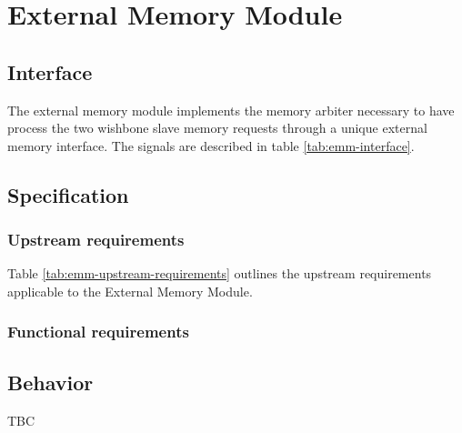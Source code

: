 \section{External Memory Module}

  \subsection{Interface}

    \begin{content}
        The external memory module implements the memory arbiter necessary to have process the two wishbone slave memory requests through a unique external memory interface. The signals are described in table \ref{tab:emm-interface}. 
      \end{content}

    

  \subsection{Specification}

    \subsubsection{Upstream requirements}

      Table \ref{tab:emm-upstream-requirements} outlines the upstream requirements applicable to the External Memory Module.

      

    \subsubsection{Functional requirements}

  \subsection{Behavior}

    \begin{content}
        TBC
      \end{content}

\newpage
